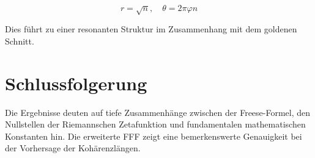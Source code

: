 \documentclass{article}
\begin{document}
\begin{equation}
r = \sqrt{n}, \quad \theta = 2\pi \varphi n
\end{equation}

Dies führt zu einer resonanten Struktur im Zusammenhang mit dem goldenen Schnitt.

\section{Schlussfolgerung}
Die Ergebnisse deuten auf tiefe Zusammenhänge zwischen der Freese-Formel, den Nullstellen der Riemannschen Zetafunktion und fundamentalen mathematischen Konstanten hin. Die erweiterte FFF zeigt eine bemerkenswerte Genauigkeit bei der Vorhersage der Kohärenzlängen.
\end{document}
